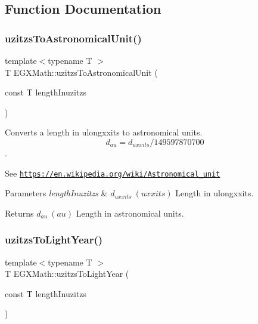 \subsection{Function Documentation}
\mbox{\label{group___e_g_x_math-_conversions-_length_conversions-uzitzs-_astronomical_ga5b92a4634ad3e80173c05bc3ff39f079}} 
\subsubsection{\texorpdfstring{uzitzs\+To\+Astronomical\+Unit()}{uzitzsToAstronomicalUnit()}}
{\footnotesize\ttfamily template$<$typename T $>$ \\
T E\+G\+X\+Math\+::uzitzs\+To\+Astronomical\+Unit (\begin{DoxyParamCaption}\item[{const T}]{length\+Inuzitzs }\end{DoxyParamCaption})}



Converts a length in ulongxxits to astronomical units. \[ d_{au}=d_{uxxits} / 149597870700 \]. 

See \href{https://en.wikipedia.org/wiki/Astronomical_unit}{\tt https\+://en.\+wikipedia.\+org/wiki/\+Astronomical\+\_\+unit} 
\begin{DoxyParams}{Parameters}
{\em length\+Inuzitzs} & $ d_{uxxits}\ (uxxits)$ Length in ulongxxits. \\
\hline
\end{DoxyParams}
\begin{DoxyReturn}{Returns}
$ d_{au}\ (au)$ Length in astronomical units. 
\end{DoxyReturn}
\mbox{\label{group___e_g_x_math-_conversions-_length_conversions-uzitzs-_astronomical_gaa6ada41d9c8a7516cb5fe8ab01976b27}} 
\subsubsection{\texorpdfstring{uzitzs\+To\+Light\+Year()}{uzitzsToLightYear()}}
{\footnotesize\ttfamily template$<$typename T $>$ \\
T E\+G\+X\+Math\+::uzitzs\+To\+Light\+Year (\begin{DoxyParamCaption}\item[{const T}]{length\+Inuzitzs }\end{DoxyParamCaption})}



